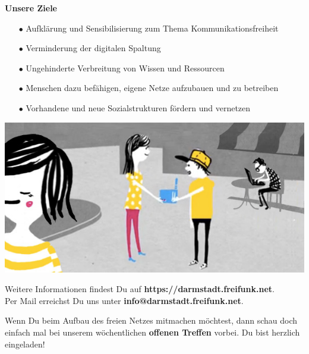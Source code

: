 \documentclass[a4paper]{article}
\begin{document}
\vspace{1.5em}

\begin{Row}
  \begin{Cell}{5}
    \textbf{Unsere Ziele}\vspace*{-0.35cm}
		\begin{itemize}
			\setlength{\itemindent}{0.5em}
			\item[\textcolor{freifunkpink}{\Large$\bullet$}] Aufklärung und Sensibilisierung zum Thema Kommunikationsfreiheit\vspace*{-0.3cm}
			\item[\textcolor{freifunkpink}{\Large$\bullet$}] Verminderung der digitalen Spaltung\vspace*{-0.3cm}
			\item[\textcolor{freifunkpink}{\Large$\bullet$}] Ungehinderte Verbreitung von Wissen und Ressourcen\vspace*{-0.3cm}
			\item[\textcolor{freifunkpink}{\Large$\bullet$}] Menschen dazu befähigen, eigene Netze aufzubauen und zu betreiben\vspace*{-0.3cm}
			\item[\textcolor{freifunkpink}{\Large$\bullet$}] Vorhandene und neue Sozialstrukturen fördern und vernetzen\vspace*{-0.3cm}
		\end{itemize}
  \end{Cell}
\end{Row}


\begin{center}
	\vspace{.3cm}
	\hspace*{-0.05 \paperwidth}\includegraphics[width=\paperwidth]{../images/community_router}
\end{center}

Weitere Informationen findest Du auf \textbf{https://darmstadt.freifunk.net}.\\
Per Mail erreichst Du uns unter \textbf{info@darmstadt.freifunk.net}.

Wenn Du beim Aufbau des freien Netzes mitmachen möchtest, dann schau doch einfach
mal bei unserem wöchentlichen \textbf{offenen Treffen} vorbei. Du bist herzlich eingeladen!
\end{document}
